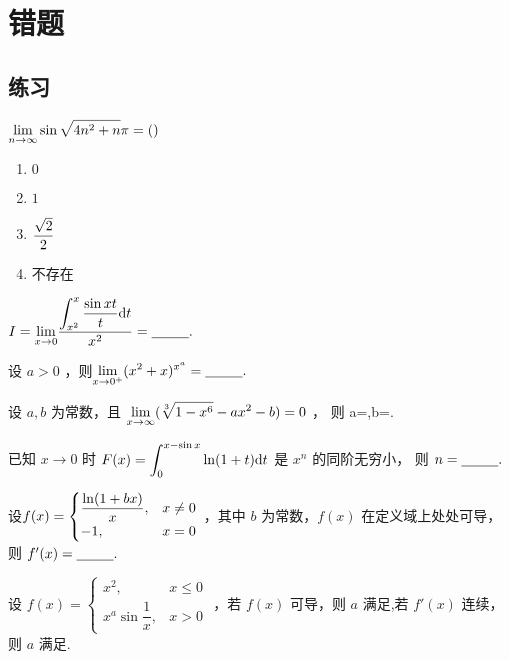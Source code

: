 \chapter{错题}
\section{练习}

\begin{Quest}[\goto{E1}]
    $\displaystyle {\displaystyle\lim_{n\rightarrow \infty}}\sin\sqrt{4n^2+n}\pi=() $
    \begin{enumerate}
        \item $ 0 $ 
        \item $ 1 $ 
        \item $ \displaystyle \frac{\sqrt 2}{2} $ 
        \item 不存在
    \end{enumerate}
\end{Quest}

\begin{quest}[660T9]
    $\displaystyle
        I = {\displaystyle\lim_{x\rightarrow 0}}\dfrac{\displaystyle \int_{x^2}^x\dfrac{\sin xt}{t}\mathrm{d}t}{x^2}
        =\underline{~~~~~~~~}.
    $ 
\end{quest}

\begin{quest}[660T11]
    设 $ a>0 $ ，则$\displaystyle
        {\displaystyle\lim_{x\rightarrow 0^+}}(x^2+x)^{x^a} = \underline{~~~~~~~~}.
    $
\end{quest}

\begin{quest}[660T17]
    设 $ a,b $ 为常数，且 $ \displaystyle {\displaystyle\lim_{x\rightarrow \infty}}(\displaystyle\sqrt[3]{1-x^6}-ax^2-b) = 0 $ ，
    则 a=\qline,b=\qline.
\end{quest}

\begin{quest}[660T21]
    已知 $ x\rightarrow0 $ 时 $ \displaystyle F(x) = \int_0^{x-\sin x}\ln(1+t)\mathrm{d}t $ 是 $ x^n $ 的同阶无穷小，
    则 $ n = \underline{~~~~~~~~}. $ 
\end{quest}

\begin{quest}[660T27]
    设$ \displaystyle f(x) = \begin{cases}
        \dfrac{\ln (1+bx)}{x},& x\neq0\\-1,& x = 0
    \end{cases} $ ，其中 $ b $ 为常数，$ f(x) $ 在定义域上处处可导，则 $ f'(x) = \underline{~~~~~~~~}. $ 
\end{quest}

\begin{quest}[660T28]
    设 $ f(x) = \begin{cases}
        x^2,&x\leq 0\\ 
        x^a\sin \dfrac{1}{x},& x > 0
    \end{cases} $ ，若 $ f(x) $ 可导，则 $ a $ 满足\qline,若 $ f'(x) $ 连续，则 $ a $ 满足\qline.
\end{quest}

